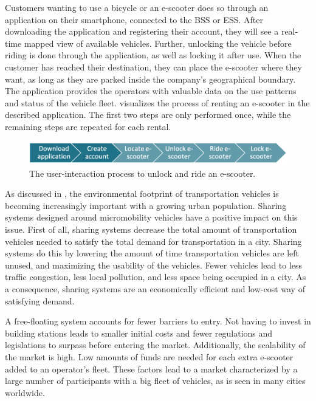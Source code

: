 Customers wanting to use a bicycle or an e-scooter does so through an application on their smartphone, connected to the BSS or ESS. After downloading the application and registering their account, they will see a real-time mapped view of available vehicles. Further, unlocking the vehicle before riding is done through the application, as well as locking it after use. When the customer has reached their destination, they can place the e-scooter where they want, as long as they are parked inside the company's geographical boundary. The application provides the operators with valuable data on the use patterns and status of the vehicle fleet.  visualizes the process of renting an e-scooter in the described application. The first two steps are only performed once, while the remaining steps are repeated for each rental. 
 \\
\begin{figure}[H]
    \centering
    \includegraphics[width=0.9\columnwidth]{Images/user_interaction.png}
    \caption{The user-interaction process to unlock and ride an e-scooter.}
    \label{fig:application}
\end{figure}

As discussed in , the environmental footprint of transportation vehicles is becoming increasingly important with a growing urban population. Sharing systems designed around micromobility vehicles have a positive impact on this issue. First of all, sharing systems decrease the total amount of transportation vehicles needed to satisfy the total demand for transportation in a city. Sharing systems do this by lowering the amount of time transportation vehicles are left unused, and maximizing the usability of the vehicles. Fewer vehicles lead to less traffic congestion, less local pollution, and less space being occupied in a city. As a consequence, sharing systems are an economically efficient and low-cost way of satisfying demand. 

A free-floating system accounts for fewer barriers to entry. Not having to invest in building stations leads to smaller initial costs and fewer regulations and legislations to surpass before entering the market. Additionally, the scalability of the market is high. Low amounts of funds are needed for each extra e-scooter added to an operator's fleet. These factors lead to a market characterized by a large number of participants with a big fleet of vehicles, as is seen in many cities worldwide. 


